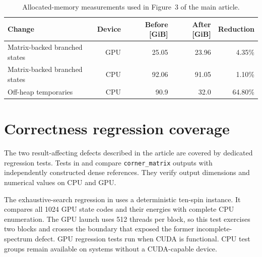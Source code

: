 \documentclass[preprint,12pt,a4paper]{elsarticle}
\begin{document}
\begin{table}[htbp]
\small
\centering
\caption{Allocated-memory measurements used in Figure~3 of the main article.}
\label{tab:supp-allocation}
\begin{tabular}{@{}lrrrr@{}}
\toprule
Change & Device & Before [GiB] & After [GiB] & Reduction \\
\midrule
Matrix-backed branched states & GPU & 25.05 & 23.96 & 4.35\% \\
Matrix-backed branched states & CPU & 92.06 & 91.05 & 1.10\% \\
Off-heap temporaries & CPU & 90.9 & 32.0 & 64.80\% \\
\bottomrule
\end{tabular}
\end{table}
\FloatBarrier

\section{Correctness regression coverage}
\label{sec:supp-correctness}

The two result-affecting defects described in the article are covered by
dedicated regression tests. Tests in
 and
 compare
\texttt{corner\_matrix} outputs with independently constructed dense references.
They verify output dimensions and numerical values on CPU and GPU.

The exhaustive-search regression in  uses a
deterministic ten-spin instance. It compares all 1024 GPU state codes and their
energies with complete CPU enumeration. The GPU launch uses 512 threads per
block, so this test exercises two blocks and crosses the boundary that exposed
the former incomplete-spectrum defect. GPU regression tests run when CUDA is
functional. CPU test groups remain available on systems without a CUDA-capable
device.
\FloatBarrier
\end{document}
